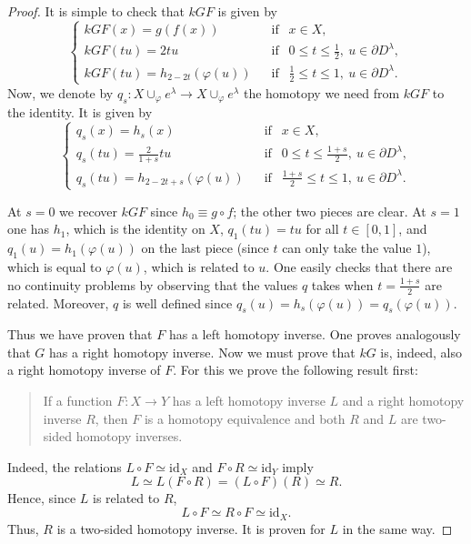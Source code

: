 \begin{proof}
    It is simple to check that $kGF$ is given by
    \begin{equation*}
        \begin{cases}
            kGF(x) = g(f(x)) &~~\text{ if }~~ x\in X,\\
            kGF(tu) = 2tu &~~\text{ if }~~ 0\le t\le \frac{1}{2},~u\in \partial D^{\lambda},\\
            kGF(tu) = h_{2-2t}(\varphi(u)) &~~\text{ if }~~ \frac{1}{2}\le t\le 1,~u\in \partial D^{\lambda}.
        \end{cases}
    \end{equation*}
    Now, we denote by $q_s:X\cup_{\varphi} e^{\lambda}\to X\cup_{\varphi} e^{\lambda}$ the homotopy we need from $kGF$ to the identity. It is given by
    \begin{equation*}
        \begin{cases}
            q_s(x) = h_s(x) &~~\text{ if }~~ x\in X,\\
            q_s(tu) = \frac{2}{1+s}tu &~~\text{ if }~~ 0\le t\le \frac{1+s}{2},~u\in \partial D^{\lambda},\\
            q_s(tu) = h_{2-2t+s}(\varphi(u)) &~~\text{ if }~~ \frac{1+s}{2}\le t\le 1,~u\in \partial D^{\lambda}.
        \end{cases}
    \end{equation*}

    At $s=0$ we recover $kGF$ since $h_0\equiv g\circ f$; the other two pieces are clear. At $s=1$ one has $h_1$, which is the identity on $X$, $q_1(tu)=tu$ for all $t\in[0,1]$, and $q_1(u)=h_1(\varphi(u))$ on the last piece (since $t$ can only take the value $1$), which is equal to $\varphi(u)$, which is related to $u$. One easily checks that there are no continuity problems by observing that the values $q$ takes when $t=\frac{1+s}{2}$ are related. Moreover, $q$ is well defined since $q_s(u) = h_s(\varphi(u)) = q_s(\varphi(u))$.

    Thus we have proven that $F$ has a left homotopy inverse. One proves analogously that $G$ has a right homotopy inverse. Now we must prove that $kG$ is, indeed, also a right homotopy inverse of $F$. For this we prove the following result first:
    \begin{quote}
        If a function $F:X\to Y$ has a left homotopy inverse $L$ and a right homotopy inverse $R$, then $F$ is a homotopy equivalence and both $R$ and $L$ are two-sided homotopy inverses.
    \end{quote}
    \medskip
    Indeed, the relations $L\circ F \simeq \text{id}_{X}$ and $F\circ R \simeq \text{id}_{Y}$ imply
    \begin{equation*}
        L \simeq L(F\circ R) = (L\circ F)(R) \simeq R.
    \end{equation*}
    Hence, since $L$ is related to $R$,
    \begin{equation*}
        L\circ F \simeq R\circ F \simeq \text{id}_{X}.
    \end{equation*}
    Thus, $R$ is a two-sided homotopy inverse. It is proven for $L$ in the same way.


\end{proof}
